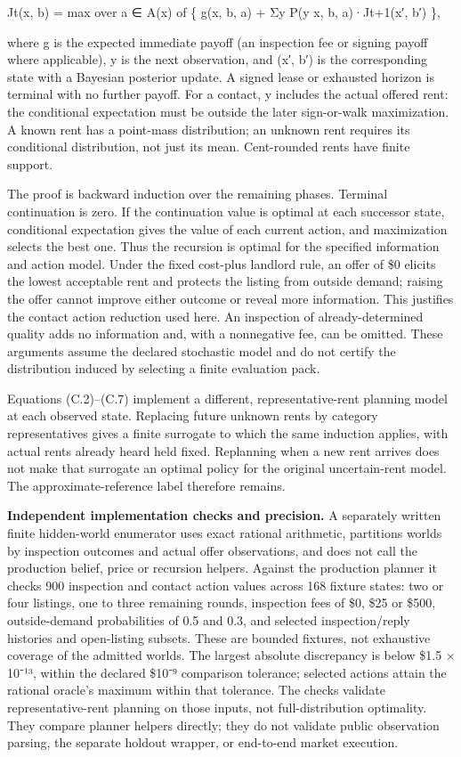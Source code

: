 Jt(x, b) = max over a ∈ A(x) of \{ g(x, b, a) + Σy P(y \textbar{} x, b, a)·Jt+1(x′, b′) \},

where g is the expected immediate payoff (an inspection fee or signing payoff where applicable), y is the next
observation, and (x′, b′) is the corresponding state with a Bayesian posterior update. A signed lease or exhausted
horizon is terminal with no further payoff. For a contact, y includes the actual offered rent: the conditional
expectation must be outside the later sign-or-walk maximization. A known rent has a point-mass distribution;
an unknown rent requires its conditional distribution, not just its mean. Cent-rounded rents have finite support.

The proof is backward induction over the remaining phases. Terminal continuation is zero. If the continuation
value is optimal at each successor state, conditional expectation gives the value of each current action, and
maximization selects the best one. Thus the recursion is optimal for the specified information and action model.
Under the fixed cost-plus landlord rule, an offer of \$0 elicits the lowest acceptable rent and protects the listing
from outside demand; raising the offer cannot improve either outcome or reveal more information. This justifies
the contact action reduction used here. An inspection of already-determined quality adds no information and,
with a nonnegative fee, can be omitted. These arguments assume the declared stochastic model and do not certify
the distribution induced by selecting a finite evaluation pack.

Equations (C.2)--(C.7) implement a different, representative-rent planning model at each observed state. Replacing
future unknown rents by category representatives gives a finite surrogate to which the same induction applies,
with actual rents already heard held fixed. Replanning when a new rent arrives does not make that surrogate an
optimal policy for the original uncertain-rent model. The approximate-reference label therefore remains.

\textbf{Independent implementation checks and precision.} A separately written finite hidden-world enumerator uses
exact rational arithmetic, partitions worlds by inspection outcomes and actual offer observations, and does not
call the production belief, price or recursion helpers. Against the production planner it checks 900 inspection
and contact action values across 168 fixture states: two or four listings, one to three remaining rounds,
inspection fees of \$0, \$25 or \$500, outside-demand probabilities of 0.5 and 0.3, and selected inspection/reply
histories and open-listing subsets. These are bounded fixtures, not exhaustive coverage of the admitted worlds.
The largest absolute discrepancy is below \$1.5 × 10⁻¹³, within the declared \$10⁻⁹ comparison tolerance; selected
actions attain the rational oracle's maximum within that tolerance. The checks validate representative-rent
planning on those inputs, not full-distribution optimality. They compare planner helpers directly; they do not
validate public observation parsing, the separate holdout wrapper, or end-to-end market execution.

